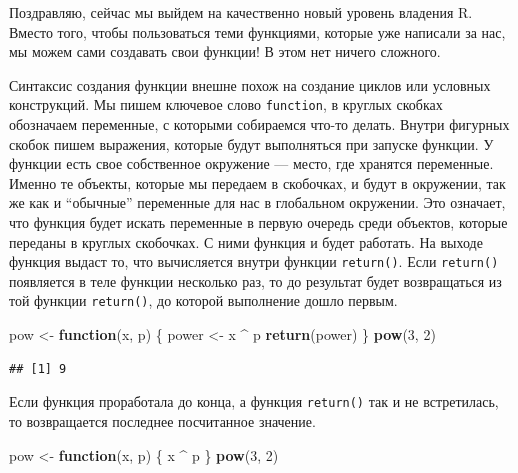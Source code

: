 \documentclass[
]{book}
\newenvironment{Shaded}{\begin{snugshade}}{\end{snugshade}}
\newcommand{\ControlFlowTok}[1]{\textcolor[rgb]{0.13,0.29,0.53}{\textbf{#1}}}
\newcommand{\DecValTok}[1]{\textcolor[rgb]{0.00,0.00,0.81}{#1}}
\newcommand{\KeywordTok}[1]{\textcolor[rgb]{0.13,0.29,0.53}{\textbf{#1}}}
\newcommand{\NormalTok}[1]{#1}
\newcommand{\OperatorTok}[1]{\textcolor[rgb]{0.81,0.36,0.00}{\textbf{#1}}}
\newcommand{\StringTok}[1]{\textcolor[rgb]{0.31,0.60,0.02}{#1}}
\begin{document}
Поздравляю, сейчас мы выйдем на качественно новый уровень владения R. Вместо того, чтобы пользоваться теми функциями, которые уже написали за нас, мы можем сами создавать свои функции! В этом нет ничего сложного.

Синтаксис создания функции внешне похож на создание циклов или условных конструкций. Мы пишем ключевое слово \texttt{function}, в круглых скобках обозначаем переменные, с которыми собираемся что-то делать. Внутри фигурных скобок пишем выражения, которые будут выполняться при запуске функции. У функции есть свое собственное окружение --- место, где хранятся переменные. Именно те объекты, которые мы передаем в скобочках, и будут в окружении, так же как и ``обычные'' переменные для нас в глобальном окружении. Это означает, что функция будет искать переменные в первую очередь среди объектов, которые переданы в круглых скобочках. С ними функция и будет работать. На выходе функция выдаст то, что вычисляется внутри функции \texttt{return()}. Если \texttt{return()} появляется в теле функции несколько раз, то до результат будет возвращаться из той функции \texttt{return()}, до которой выполнение дошло первым.

\begin{Shaded}
\begin{Highlighting}[]
\NormalTok{pow <-}\StringTok{ }\ControlFlowTok{function}\NormalTok{(x, p) \{}
\NormalTok{  power <-}\StringTok{ }\NormalTok{x }\OperatorTok{^}\StringTok{ }\NormalTok{p}
  \KeywordTok{return}\NormalTok{(power)}
\NormalTok{\}}
\KeywordTok{pow}\NormalTok{(}\DecValTok{3}\NormalTok{, }\DecValTok{2}\NormalTok{)}
\end{Highlighting}
\end{Shaded}

\begin{verbatim}
## [1] 9
\end{verbatim}

Если функция проработала до конца, а функция \texttt{return()} так и не встретилась, то возвращается последнее посчитанное значение.

\begin{Shaded}
\begin{Highlighting}[]
\NormalTok{pow <-}\StringTok{ }\ControlFlowTok{function}\NormalTok{(x, p) \{}
\NormalTok{  x }\OperatorTok{^}\StringTok{ }\NormalTok{p}
\NormalTok{\}}
\KeywordTok{pow}\NormalTok{(}\DecValTok{3}\NormalTok{, }\DecValTok{2}\NormalTok{)}
\end{Highlighting}
\end{Shaded}
\end{document}
